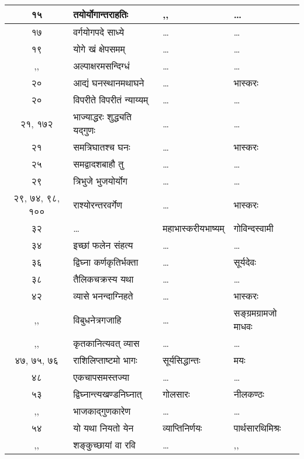 \documentclass[11pt, openany]{book}
\begin{document}
\begin{center}
\begin{longtable}{|c|p{4.2cm}|p{3cm}|p{2.7cm}|}
		\hline
		१५ & तयोर्योगान्तराहतिः\textemdash  & ,,  & \ldots \\
		\hline
		१७ & वर्गयोगपदे साध्ये\textemdash & \ldots  & \ldots \\
		\hline
		१९ & योगे खं क्षेपसमम्\textemdash & \ldots  & \ldots \\
		\hline
		,, & अल्पाक्षरमसन्दिग्धं\textemdash  & \ldots  & \ldots \\
		\hline
		२० & आद्यं घनस्थानमथाघने\textemdash  & \ldots  & भास्करः \\
		\hline
		२० & विपरीते विपरीतं न्याय्यम्\textemdash  & \ldots  & \ldots \\
		\hline
		२१, १७२ & भाज्याद्धरः शुद्ध्यति यद्गुणः\textemdash  & \ldots  & \ldots \\
		\hline
		२१ & समत्रिघातश्च घनः\textemdash & \ldots & भास्करः  \\
		\hline
		२५  & समद्वादशबाहौ तु\textemdash & \ldots  & \ldots \\
		\hline
		२९  & त्रिभुजे भुजयोर्योग\textemdash & \ldots & \ldots \\
		\hline
		२९, ७४, ९८, १०० & राश्योरन्तरवर्गेण\textemdash  & \ldots  & भास्करः \\
		\hline
		३२ & \ldots & महाभास्करीयभाष्यम्  & गोविन्दस्वामी  \\
		\hline
		३४  & इच्छां फलेन संहत्य\textemdash  & \ldots  & \ldots \\
		\hline
		३६  & द्विघ्ना कर्णकृतिर्भक्ता\textemdash & \ldots  & सूर्यदेवः \\
		\hline
		३८ & तैलिकचक्रस्य यथा\textemdash & \ldots  & \ldots  \\
		\hline
		४२ & व्यासे भनन्दाग्निहते\textemdash  & \ldots  & भास्करः \\
		\hline
		,, & विबुधनेत्रगजाहि\textemdash & \ldots  & सङ्ग्रमग्रामजो माधवः  \\
		\hline
		,, & कृतकानित्यवत् व्यास\textemdash & \ldots  & \ldots \\
		\hline
		४७, ७५, ७६ & राशिलिप्ताष्टमो भागः\textemdash & सूर्यसिद्धान्तः  & मयः \\
		\hline
		४८ & एकचापसमस्तज्या\textemdash  & \ldots  & \ldots \\
		\hline
		५३ & द्विघ्नान्त्यखण्डनिघ्नात्\textemdash & गोलसारः  & नीलकण्ठः \\
		\hline
		,, & भाजकाद्गुणकारेण\textemdash & \ldots \ & \ldots \\
		\hline
		५४ & यो यथा नियतो येन\textemdash & व्याप्तिनिर्णयः  & पार्थसारथिमिश्रः  \\
		\hline
		,, & शङ्कुच्छायां वा रवि  & \ldots  & ,, \\

\end{longtable}
\end{center}
\end{document}
